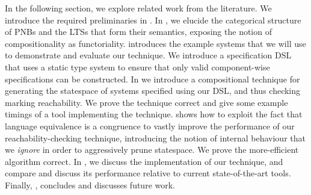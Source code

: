 In the following section, we explore related work from the literature.
We introduce the required preliminaries in . In
, we elucide the categorical structure of PNBs and the
LTSs that form their semantics, exposing the notion of compositionality as
functoriality.   introduces the example systems
that we will use to demonstrate and evaluate our technique. We introduce a
specification DSL that uses a static type system to ensure that only valid
component-wise specifications can be constructed.  In 
we introduce a compositional technique for generating the statespace of systems
specified using our DSL, and thus checking marking reachability. We prove the
technique correct and give some example timings of a tool implementing the
technique.   shows how to exploit the fact that
language equivalence is a congruence to vastly improve the performance of our
reachability-checking technique, introducing the notion of internal behaviour
that we \emph{ignore} in order to aggressively prune statespace. We prove the
more-efficient algorithm correct.  In , we
discuss the implementation of our technique, and compare and discuss its
performance relative to current state-of-the-art tools.  Finally,
, concludes and discusses future work.
